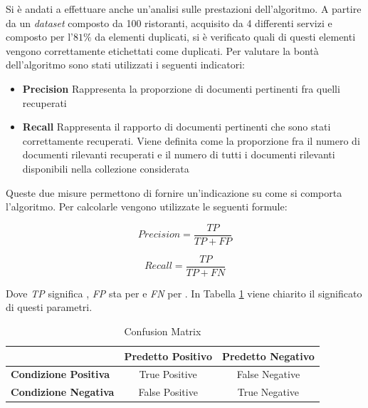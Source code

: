 Si è andati a effettuare anche un'analisi sulle prestazioni dell'algoritmo. A partire da un \emph{dataset} composto da 100 ristoranti, acquisito da 4 differenti servizi e composto per l'$ 81\% $ da elementi duplicati, si è verificato quali di questi elementi vengono correttamente etichettati come duplicati. Per valutare la bontà dell'algoritmo sono stati utilizzati i seguenti indicatori:

\begin{itemize}
	\item \textbf{Precision} Rappresenta la proporzione di documenti pertinenti fra quelli recuperati
	\item \textbf{Recall} Rappresenta il rapporto di documenti pertinenti che sono stati correttamente recuperati. Viene definita come la proporzione fra il numero di documenti rilevanti recuperati e il numero di tutti i documenti rilevanti disponibili nella collezione considerata
\end{itemize}

Queste due misure permettono di fornire un'indicazione su come si comporta l'algoritmo. Per calcolarle vengono utilizzate le seguenti formule:

\begin{center}
	\begin{minipage}[t]{0.5\textwidth}
		\begin{equation*}
		Precision = \frac{TP}{TP + FP}
		\end{equation*}
	\end{minipage}%
	\begin{minipage}[t]{0.5\textwidth}
		\begin{equation*}
		Recall = \frac{TP}{TP + FN}
		\end{equation*}
	\end{minipage}
\end{center}

Dove \emph{TP} significa , \emph{FP} sta per  e \emph{FN} per . In Tabella \ref{table:confusion-matrix} viene chiarito il significato di questi parametri.

\begin{table}[ht]
	\caption{Confusion Matrix}
	\label{table:confusion-matrix}
	\begin{tabularx}{\textwidth}{l | cc}
		\toprule
		& \textbf{Predetto Positivo} & \textbf{Predetto Negativo} \\
		\midrule
		\textbf{Condizione Positiva} & True Positive & False Negative  \\
		\hline
		\textbf{Condizione Negativa} & False Positive & True Negative \\
		\bottomrule
	\end{tabularx}
\end{table}

